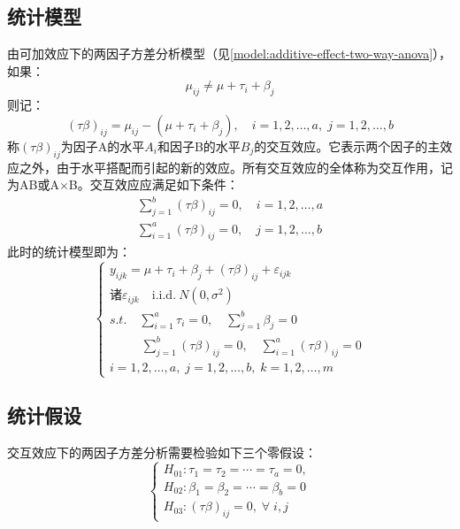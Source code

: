 \subsection{统计模型}
由可加效应下的两因子方差分析模型（见\cref{model:additive-effect-two-way-anova}），如果：
\begin{equation*}
	\mu_{ij}\ne \mu+\tau_i+\beta_j
\end{equation*}
则记：
\begin{equation*}
	(\tau\beta)_{ij}=\mu_{ij}-(\mu+\tau_i+\beta_j),\quad i=1,2,\dots,a,\;j=1,2,\dots,b
\end{equation*}
称$(\tau\beta)_{ij}$为因子A的水平$A_i$和因子B的水平$B_j$的交互效应。它表示两个因子的主效应之外，由于水平搭配而引起的新的效应。所有交互效应的全体称为交互作用，记为AB或A$\times$B。交互效应应满足如下条件：
\begin{gather*}
	\sum_{j=1}^b(\tau\beta)_{ij}=0,\quad i=1,2,\dots,a \\
	\sum_{i=1}^a(\tau\beta)_{ij}=0,\quad j=1,2,\dots,b
\end{gather*}
此时的统计模型即为：
\begin{equation*}\label{model:interaction-effect-two-way-anova}
	\begin{cases}
		y_{ijk}=\mu+\tau_i+\beta_j+(\tau\beta)_{ij}+\varepsilon_{ijk} \\
		\text{诸}\varepsilon_{ijk}\quad\mathrm{i.i.d.~}N(0,\sigma^2) \\
		s.t.\quad\sum\limits_{i=1}^a\tau_i=0,\quad\sum\limits_{j=1}^b\beta_j=0 \\
		\qquad\;\;\sum\limits_{j=1}^b(\tau\beta)_{ij}=0,\quad 	\sum\limits_{i=1}^a(\tau\beta)_{ij}=0 \\
		i=1,2,\dots,a,\;j=1,2,\dots,b,\;k=1,2,\dots,m
	\end{cases}
\end{equation*}

\subsection{统计假设}
交互效应下的两因子方差分析需要检验如下三个零假设：
\begin{equation*}
	\begin{cases}
		H_{01}:\tau_1=\tau_2=\cdots=\tau_a=0, \\
		H_{02}:\beta_1=\beta_2=\cdots=\beta_b=0 \\
		H_{03}:(\tau\beta)_{ij}=0,\;\forall\;i,j
	\end{cases}
\end{equation*}

